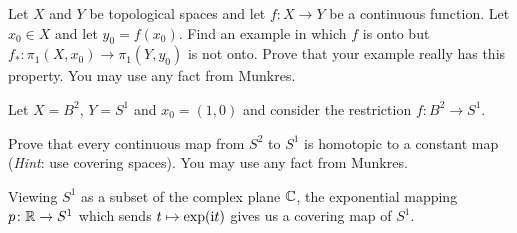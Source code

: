 \begin{problem}
  Let \(X\) and \(Y\) be topological spaces and let \(f\colon X\to Y\) be a
  continuous function. Let \(x_0\in X\) and let \(y_0=f(x_0)\). Find an
  example in which \(f\) is onto but
  \(f_*\colon\pi_1(X,x_0)\to\pi_1(Y,y_0)\) is not onto. Prove that your
  example really has this property. You may use any fact from Munkres.
\end{problem}
\begin{solution}
  Let \(X=B^2\), \(Y=S^1\) and \(x_0=(1,0)\) and consider the restriction
  \(f\colon B^2\to S^1\).
\end{solution}

\begin{problem}
  Prove that every continuous map from \(S^2\) to \(S^1\) is homotopic to a
  constant map (\emph{Hint}: use covering spaces). You may use any fact
  from Munkres.
\end{problem}
\begin{solution}
  Viewing \(S^1\) as a subset of the complex plane \(\mathbb{C}\), the
  exponential mapping \(p\colon\mathbb{R}\to S^1\) which sends
  \(t\mapsto \exp(\mathrm{i} t)\) gives us a covering map of \(S^1\).
\end{solution}

